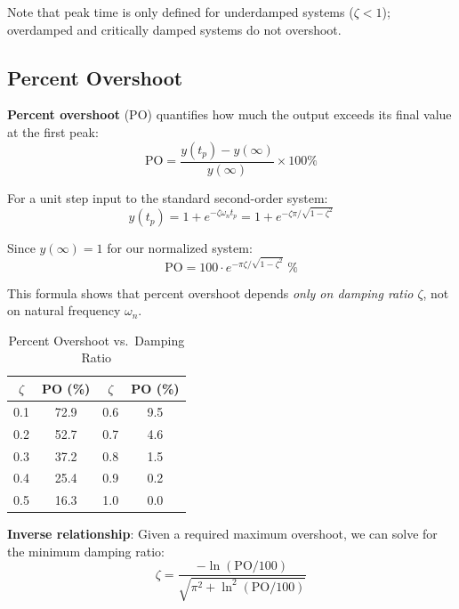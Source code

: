 Note that peak time is only defined for underdamped systems ($\zeta < 1$); overdamped and critically damped systems do not overshoot.

\subsection{Percent Overshoot}

\textbf{Percent overshoot} (PO) quantifies how much the output exceeds its final value at the first peak:
\begin{equation}
    \text{PO} = \frac{y(t_p) - y(\infty)}{y(\infty)} \times 100\%
\end{equation}

For a unit step input to the standard second-order system:
\begin{equation}
    y(t_p) = 1 + e^{-\zeta\omega_n t_p} = 1 + e^{-\zeta\pi/\sqrt{1-\zeta^2}}
\end{equation}

Since $y(\infty) = 1$ for our normalized system:
\begin{equation}
    \boxed{\text{PO} = 100 \cdot e^{-\pi\zeta/\sqrt{1-\zeta^2}} \;\%}
    \label{eq:percent_overshoot}
\end{equation}

This formula shows that percent overshoot depends \textit{only on damping ratio $\zeta$}, not on natural frequency $\omega_n$.

\begin{table}[H]
\centering
\caption{Percent Overshoot vs.\ Damping Ratio}
\label{tab:overshoot_zeta}
\begin{tabular}{cc|cc}
\toprule
$\zeta$ & PO (\%) & $\zeta$ & PO (\%) \\
\midrule
0.1 & 72.9 & 0.6 & 9.5 \\
0.2 & 52.7 & 0.7 & 4.6 \\
0.3 & 37.2 & 0.8 & 1.5 \\
0.4 & 25.4 & 0.9 & 0.2 \\
0.5 & 16.3 & 1.0 & 0.0 \\
\bottomrule
\end{tabular}
\end{table}

\textbf{Inverse relationship}: Given a required maximum overshoot, we can solve for the minimum damping ratio:
\begin{equation}
    \boxed{\zeta = \frac{-\ln(\text{PO}/100)}{\sqrt{\pi^2 + \ln^2(\text{PO}/100)}}}
    \label{eq:zeta_from_PO}
\end{equation}

